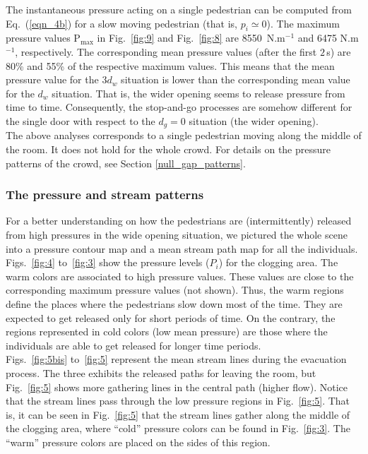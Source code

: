 The instantaneous pressure acting on a single pedestrian can be computed from 
Eq.~(\ref{eqn_4b}) for a slow moving pedestrian (that is, $p_i\simeq 0$). 
The maximum pressure values $\mathrm{P}_\mathrm{max}$ in 
Fig.~\ref{fig:9} and Fig.~\ref{fig:8} are 8550~N.m$^{-1}$ and 6475 N.m$^{-1}$, respectively. 
The corresponding mean pressure values (after the first $2\,$s) are 80\% and 
55\% of the respective maximum values. This means that the mean pressure value for the 
$3d_w$ situation is lower than the corresponding mean value for the $d_w$ situation. 
That is, the wider opening seems to release pressure from time to time. Consequently, 
the stop-and-go processes are somehow different for the 
single door with respect to the $d_g=0$ situation (the wider opening). \\

The above analyses corresponds to a single pedestrian moving along the middle of 
the room. It does not hold for the whole crowd. For details on the pressure patterns of the 
crowd, see Section \ref{null_gap_patterns}. 

\subsubsection{\label{null_gap_patterns}The pressure and stream patterns}

For a better understanding on how the pedestrians are (intermittently) released 
from high pressures in the wide opening situation, we pictured the whole scene 
into a pressure contour map and a mean stream path map for all the individuals. 
Figs.~\ref{fig:4} to~\ref{fig:3} show the pressure levels ($P_i$) for the 
clogging area. The warm colors are associated to high pressure values. These 
values are close to the corresponding maximum pressure values (not shown). Thus, 
the warm regions define the places where the pedestrians slow down most of the 
time. They are expected to get released only for short periods of time. On the 
contrary, the regions represented in cold colors (low mean pressure) are those 
where the individuals are able to get released for longer time periods. \\

Figs.~\ref{fig:5bis} to~\ref{fig:5} represent the mean stream lines during the evacuation 
process. The three exhibits the 
released paths for leaving the room, but Fig.~\ref{fig:5} shows more gathering lines in the central path (higher flow). Notice that the stream lines pass 
through the low pressure regions in Fig.~\ref{fig:5}. That is, it can be seen in Fig.~\ref{fig:5} 
that the stream lines gather along the middle of the clogging area, 
where ``cold'' pressure colors can be found in Fig.~\ref{fig:3}. The 
``warm'' pressure colors are placed on the sides of this region.    \\ 


